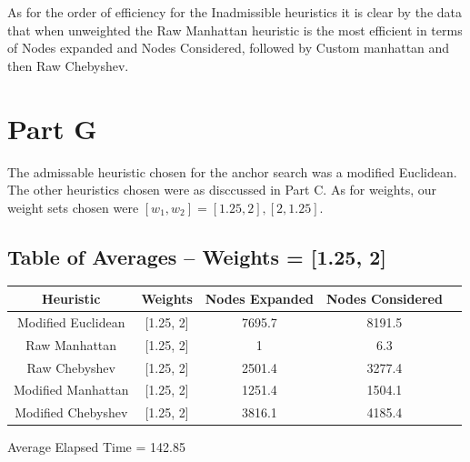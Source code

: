 \documentclass[12pt]{article}
\begin{document}
\newline
\newline
As for the order of efficiency for the Inadmissible heuristics it is clear by the data that when unweighted the Raw Manhattan heuristic is the most efficient in terms of Nodes expanded and Nodes Considered, followed by Custom manhattan and then Raw Chebyshev. 

\section{Part G}
The admissable heuristic chosen for the anchor search was a modified Euclidean. The other heuristics chosen were as disccussed in Part C. As for weights, our weight sets chosen were \([w_1,w_2] = [1.25,2],[2,1.25]\).

\subsection{Table of Averages -- Weights = [1.25, 2]}
\begin{tabular}{|c|c|c|c|c|}
\hline
	Heuristic & Weights & Nodes Expanded & Nodes Considered\\
\hline
	Modified Euclidean & [1.25, 2] & 7695.7 & 8191.5\\
\hline
	Raw Manhattan & [1.25, 2] & 1 & 6.3\\
\hline
	Raw Chebyshev & [1.25, 2] & 2501.4 & 3277.4\\
\hline
	Modified Manhattan & [1.25, 2] & 1251.4 & 1504.1\\
\hline
	Modified Chebyshev & [1.25, 2] & 3816.1 & 4185.4\\
\hline
\end{tabular}
\newline
Average Elapsed Time = 142.85
\end{document}
